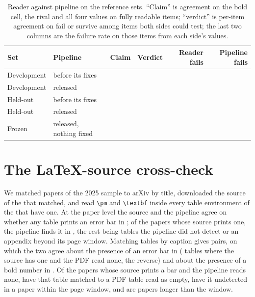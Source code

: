 \documentclass{article}
\begin{document}
\begin{table}[h]
\centering
\small
\caption{Reader against pipeline on the reference sets. ``Claim'' is agreement on
the bold cell, the rival and all four values on fully readable items;
``verdict'' is per-item agreement on fail or survive among items both sides
could test; the last two columns are the failure rate on those items from each
side's values.}
\label{tab:goldscores}
\begin{tabular}{llllrr}
\toprule
Set & Pipeline & Claim & Verdict & Reader fails & Pipeline fails \\
\midrule
Development & before its fixes & \nGoldDevClaimFrac{} & \nGoldDevAgree{} & \nGoldDevFailReader{} & \nGoldDevFailPipe{} \\
Development & released & \nGoldDevPostClaimFrac{} & \nGoldDevPostAgree{} & \nGoldDevPostFailReader{} & \nGoldDevPostFailPipe{} \\
Held-out & before its fixes & \nGoldHeldClaimFrac{} & \nGoldHeldAgree{} & \nGoldHeldFailReader{} & \nGoldHeldFailPipe{} \\
Held-out & released & \nGoldHeldPostClaimFrac{} & \nGoldHeldPostAgree{} & \nGoldHeldPostFailReader{} & \nGoldHeldPostFailPipe{} \\
Frozen & released, nothing fixed & \nGoldFrozenClaimFrac{} & \nGoldFrozenAgree{} & \nGoldFrozenFailReader{} & \nGoldFrozenFailPipe{} \\
\bottomrule
\end{tabular}
\end{table}

\section{The LaTeX-source cross-check}
\label{app:latex}

We matched \nLatexSampled{} papers of the 2025 sample to arXiv by title,
downloaded the source of the \nLatexMatched{} that matched, and read
\verb|\pm| and \verb|\textbf| inside every table environment of the
\nLatexWithTables{} that have one. At the paper level the source and the
pipeline agree on whether any table prints an error bar in
\nLatexPaperAgree{}; of the \nLatexPaperSourceBar{} papers whose source
prints one, the pipeline finds it in \nLatexPaperRecall{}, the rest being
tables the pipeline did not detect or an appendix beyond its page window.
Matching tables by caption gives \nLatexTablesMatched{} pairs, on which the
two agree about the presence of an error bar in \nLatexTableBarAgree{}
(\nLatexTableSourceOnly{} tables where the source has one and the PDF read
none, \nLatexTablePipelineOnly{} the reverse) and about the presence of a
bold number in \nLatexTableBoldAgree{}. Of the papers whose source prints a
bar and the pipeline reads none, \nLatexMissMatched{} have that table matched
to a PDF table read as empty, \nLatexMissUndetected{} have it undetected in a
paper within the page window, and \nLatexMissWindow{} are papers longer than
the window.
\end{document}
